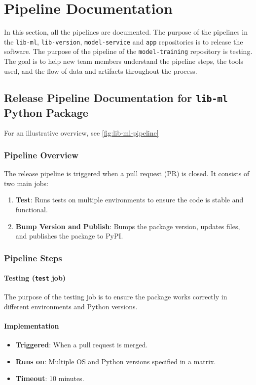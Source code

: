 \section{Pipeline Documentation}
In this section, all the pipelines are documented. The purpose of the pipelines in the \texttt{lib-ml}, \texttt{lib-version}, \texttt{model-service} and \texttt{app} repositories is to release the software. The purpose of the pipeline of the \texttt{model-training} repository is testing. The goal is to help new team members understand the pipeline steps, the tools used, and the flow of data and artifacts throughout the process.  
\subsection{Release Pipeline Documentation for \texttt{lib-ml} Python Package}
For an illustrative overview, see \autoref{fig:lib-ml-pipeline}

\subsubsection{Pipeline Overview}

The release pipeline is triggered when a pull request (PR) is closed. It consists of two main jobs:

\begin{enumerate}
    \item \textbf{Test}: Runs tests on multiple environments to ensure the code is stable and functional.
    \item \textbf{Bump Version and Publish}: Bumps the package version, updates files, and publishes the package to PyPI.
\end{enumerate}

\subsubsection{Pipeline Steps}

\paragraph{Testing (\texttt{test} job)}
The purpose of the testing job is to ensure the package works correctly in different environments and Python versions.

\paragraph{Implementation}
\begin{itemize}
    \item \textbf{Triggered}: When a pull request is merged.
    \item \textbf{Runs on}: Multiple OS and Python versions specified in a matrix.
    \item \textbf{Timeout}: 10 minutes.
\end{itemize}

